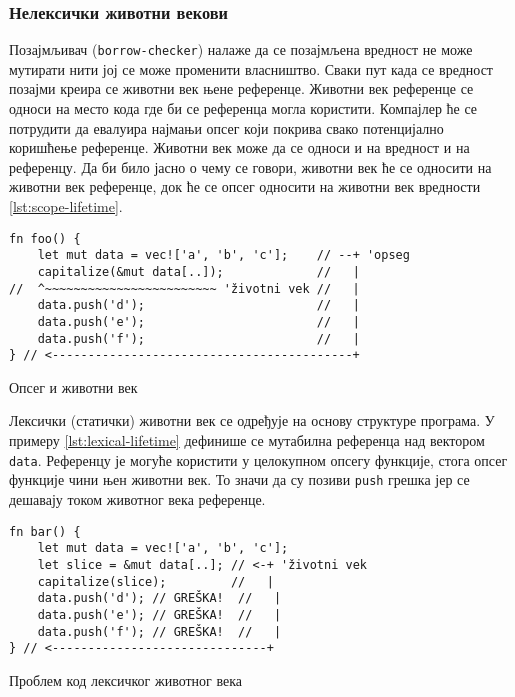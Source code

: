 \subsubsection{Нелексички животни векови}

Позајмљивач (\verb|borrow-checker|) налаже да се позајмљена вредност не може мутирати нити јој се може променити власништво. Сваки пут када се вредност позајми креира се животни век њене референце. 
Животни век референце се односи на место кода где би се референца могла користити. Компајлер ће се потрудити да евалуира најмањи опсег који покрива свако потенцијално коришћење референце.
Животни век може да се односи и на вредност и на референцу. Да би било јасно о чему се говори, животни век ће се односити на животни век референце, док ће се опсег односити на животни век вредности \ref{lst:scope-lifetime}.

\begin{listing}[H]
\begin{verbatim}
fn foo() {
    let mut data = vec!['a', 'b', 'c'];    // --+ 'opseg
    capitalize(&mut data[..]);             //   |
//  ^~~~~~~~~~~~~~~~~~~~~~~~~ 'životni vek //   |
    data.push('d');                        //   |
    data.push('e');                        //   |
    data.push('f');                        //   |
} // <------------------------------------------+
\end{verbatim}
\caption{Опсег и животни век}
\label{lst:scope-lifetime}
\end{listing}

Лексички (статички) животни век се одређује на основу структуре програма. У примеру \ref{lst:lexical-lifetime} дефинише се мутабилна референца над вектором \verb|data|.
Референцу је могуће користити у целокупном опсегу функције, стога опсег функције чини њен животни век. То значи да су позиви \verb|push| грешка јер се дешавају током животног века
референце.

\begin{listing}[H]
\begin{verbatim}
fn bar() {
    let mut data = vec!['a', 'b', 'c'];
    let slice = &mut data[..]; // <-+ 'životni vek
    capitalize(slice);         //   |
    data.push('d'); // GREŠKA!  //   |
    data.push('e'); // GREŠKA!  //   |
    data.push('f'); // GREŠKA!  //   |
} // <------------------------------+
\end{verbatim}
\caption{Проблем код лексичког животног века}
\label{lst:lexical-lifetime}
\end{listing}

